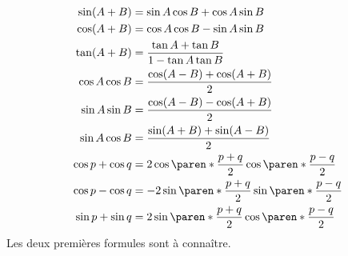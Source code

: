 \documentclass[french,xcolor=svgnames]{beamer}
\begin{document}
\begin{frame}
  \vspace{-3.ex}
  \begin{align*}
    \sin (A + B)      & = \sin A \cos B + \cos A \sin B                                                      \\
    \cos (A + B)      & = \cos A \cos B - \sin A \sin B                                                      \\
    \tan (A + B)      & = \frac{\tan A + \tan B}{1 - \tan A \tan B}                                          \\
    \cos A \cos B     & =\frac{\cos(A-B)+\cos(A+B)}2\\
    \sin A \sin B     & =\frac{\cos(A-B)-\cos(A+B)}2\\
    \sin A \cos B     & =\frac{\sin(A+B)+\sin(A-B)}2                                                        \\
    \cos p + \cos q   & = 2 \cos \paren*{ \frac{p+q} 2 } \cos \paren*{ \frac{p-q} 2 }                        \\
    \cos p - \cos q   & = -2 \sin \paren*{ \frac{p+q} 2 } \sin \paren*{ \frac{p-q} 2 }                       \\
    \sin p + \sin q   & = 2 \sin \paren*{ \frac{p+q} 2 } \cos \paren*{ \frac{p-q} 2 }
  \end{align*}\pause
  Les deux premières formules sont à connaître.
\end{frame}
\end{document}
